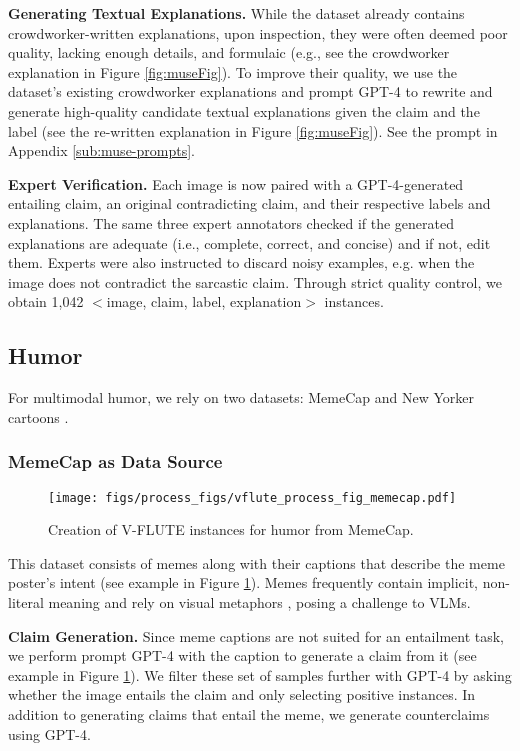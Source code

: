 {\bf Generating Textual Explanations.} While the dataset already contains crowdworker-written explanations, upon inspection, they were often deemed poor quality, lacking enough details, and formulaic (e.g., see the crowdworker explanation in Figure \ref{fig:museFig}). To improve their quality, we use the dataset's existing crowdworker explanations and prompt GPT-4 to rewrite and generate high-quality candidate textual explanations given the claim and the label (see the re-written explanation in Figure \ref{fig:museFig}). See the prompt in Appendix \ref{sub:muse-prompts}.

{\bf Expert Verification.} Each image is now paired with a GPT-4-generated entailing claim, an original contradicting claim, and their respective labels and explanations. The same three expert annotators checked if the generated explanations are adequate (i.e., complete, correct, and concise) and if not, edit them. Experts were also instructed to discard noisy examples, e.g. when the image does not contradict the sarcastic claim. Through strict quality control, we obtain 1,042 $<$image, claim, label, explanation$>$ instances.   

\subsection{Humor}
 For multimodal humor, we rely on two datasets: MemeCap \cite{hwang-shwartz-2023-memecap} and New Yorker cartoons \cite{hessel-etal-2023-androids}.

\subsubsection{MemeCap as Data Source} 

\begin{figure}[htbp]
    \centering
    \texttt{[image: figs/process\_figs/vflute\_process\_fig\_memecap.pdf]}
    \caption{Creation of V-FLUTE instances for humor from MemeCap.}
    \label{fig:memecapFig}
\end{figure}

This dataset consists of memes along with their captions that describe the meme poster's intent (see example in Figure \ref{fig:memecapFig}). Memes frequently contain implicit, non-literal meaning \cite{pioneer} and rely on visual metaphors \cite{PIATA201639}, posing a challenge to VLMs.

{\bf Claim Generation.} Since meme captions are not suited for an entailment task, we perform prompt GPT-4 with the caption to generate a claim from it (see example in Figure \ref{fig:memecapFig}). We filter these set of samples further with GPT-4 by asking whether the image entails the claim and only selecting positive instances. In addition to generating claims that entail the meme, we generate counterclaims using GPT-4.

